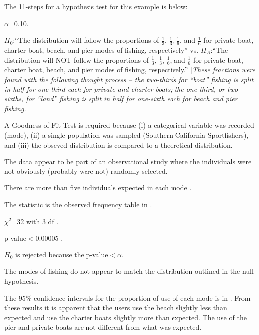 \documentclass[10pt,openany]{book}\usepackage[]{graphicx}\usepackage[]{color}
\begin{document}
The 11-steps  for a hypothesis test for this example is below:
\vspace{-12pt}
\begin{Enumerate}
  \item $\alpha$=0.10.
  \item $H_{0}$:``The distribution will follow the proportions of $\frac{1}{3}$, $\frac{1}{3}$, $\frac{1}{6}$, and $\frac{1}{6}$ for private boat, charter boat, beach, and pier modes of fishing, respectively'' vs. $H_{A}$:``The distribution will NOT follow the proportions of $\frac{1}{3}$, $\frac{1}{3}$, $\frac{1}{6}$, and $\frac{1}{6}$ for private boat, charter boat, beach, and pier modes of fishing, respectively.''  [\textit{These fractions were found with the following thought process -- the two-thirds for ``boat'' fishing is split in half for one-third each for private and charter boats; the one-third, or two-sixths, for ``land'' fishing is split in half for one-sixth each for beach and pier fishing.}]
  \item A Goodness-of-Fit Test is required because (i) a categorical variable was recorded (mode), (ii) a single population was sampled (Southern California Sportfishers), and (iii) the obseved distribution is compared to a theoretical distribution.
  \item The data appear to be part of an observational study where the individuals were not obviously (probably were not) randomly selected.
  \item There are more than five individuals expected in each mode .
  \item The statistic is the observed frequency table in .
  \item $\chi^2$=32 with 3 df .
  \item p-value$<0.00005$ .
  \item $H_{0}$ is rejected because the p-value$<\alpha$.
  \item The modes of fishing do not appear to match the distribution outlined in the null hypothesis.
  \item The 95\% confidence intervals for the proportion of use of each mode is in  . From these results it is apparent that the users use the beach slightly less than expected and use the charter boats slightly more than expected.  The use of the pier and private boats are not different from what was expected.
\end{Enumerate}
\end{document}
